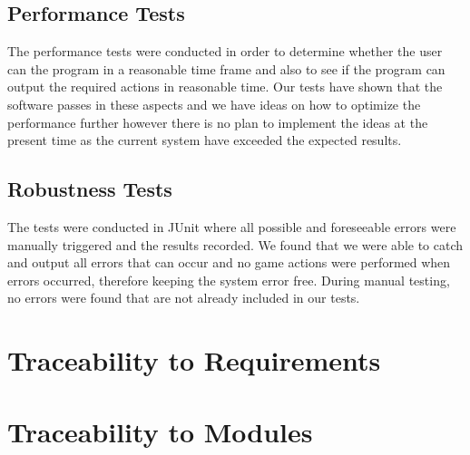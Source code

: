 \documentclass[11pt]{article}
\begin{document}
	\subsection{Performance Tests}
	The performance tests were conducted in order to determine whether the user can the program in a reasonable time frame and also to see if the program can output the required actions in reasonable time. Our tests have shown that the software passes in these aspects and we have ideas on how to optimize the performance further however there is no plan to implement the ideas at the present time as the current system have exceeded the expected results. 
	\subsection{Robustness Tests}
	The tests were conducted in JUnit where all possible and foreseeable errors were manually triggered and the results recorded. We found that we were able to catch and output all errors that can occur and no game actions were performed when errors occurred, therefore keeping the system error free. During manual testing, no errors were found that are not already included in our tests. 
	\section{Traceability to Requirements}
	\section{Traceability to Modules}
	
		
\end{document}
